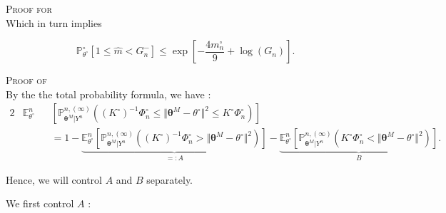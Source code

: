 \begin{pro}{\textsc{Proof for } \\}
Which in turn implies

\[\mathds{P}_{\theta^{\circ}}^{\circ} \left[1 \leq \widehat{m} < G_{n}^{-}\right] \leq \exp \left[ - \frac{4 m_{n}^{\circ}}{9} + \log\left(G_{n}\right)\right].\]
\end{pro}


\begin{pro}{\textsc{Proof of } \\}\label{proB.1.3}
By the the total probability formula, we have :
\begin{alignat*}{2}
& \mathds{E}_{\theta^{\circ}}^{n} && \left[\mathds{P}_{\boldsymbol{\theta}^{M}\vert Y^{n}}^{n, (\infty)}\left(\left(K^{\circ}\right)^{-1}\Phi_{n}^{\circ} \leq \Vert \boldsymbol{\theta}^{M} - \theta^{\circ} \Vert ^{2} \leq K^{\circ} \Phi_{n}^{\circ}\right)\right]\\
& &&= 1 - \underbrace{\mathds{E}_{\theta^{\circ}}^{n}\left[\mathds{P}_{\boldsymbol{\theta}^{M}\vert Y^{n}}^{n, (\infty)}\left(\left(K^{\circ}\right)^{-1}\Phi_{n}^{\circ} > \Vert \boldsymbol{\theta}^{M} - \theta^{\circ} \Vert ^{2} \right)\right]}_{=: A} - \underbrace{\mathds{E}_{\theta^{\circ}}^{n}\left[\mathds{P}_{\boldsymbol{\theta}^{M}\vert Y^{n}}^{n, (\infty)}\left(K^{\circ} \Phi_{n}^{\circ} < \Vert \boldsymbol{\theta}^{M} - \theta^{\circ} \Vert ^{2}\right)\right]}_{B}.
\end{alignat*}

Hence, we will control $A$ and $B$ separately.

\medskip

We first control $A$ :


\end{pro}
